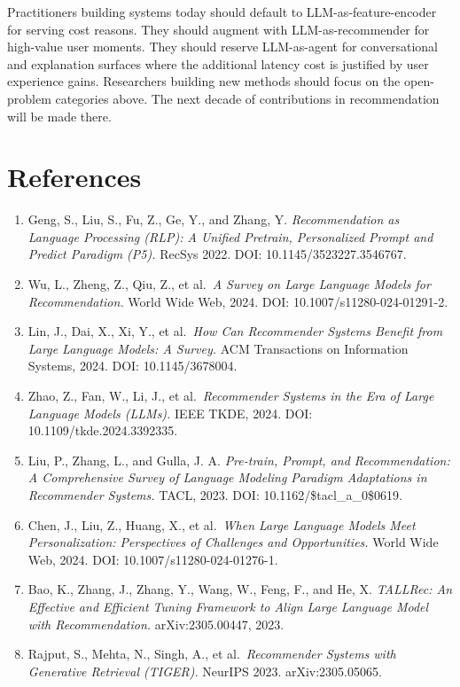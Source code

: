 Practitioners building systems today should default to LLM-as-feature-encoder for serving cost reasons. They should augment with LLM-as-recommender for high-value user moments. They should reserve LLM-as-agent for conversational and explanation surfaces where the additional latency cost is justified by user experience gains. Researchers building new methods should focus on the open-problem categories above. The next decade of contributions in recommendation will be made there.

\section{References}\label{references}

\begin{enumerate}
\def\labelenumi{\arabic{enumi}.}
\item
  Geng, S., Liu, S., Fu, Z., Ge, Y., and Zhang, Y. \emph{Recommendation as Language Processing (RLP): A Unified Pretrain, Personalized Prompt and Predict Paradigm (P5).} RecSys 2022. DOI: 10.1145/3523227.3546767.
\item
  Wu, L., Zheng, Z., Qiu, Z., et al.~\emph{A Survey on Large Language Models for Recommendation.} World Wide Web, 2024. DOI: 10.1007/s11280-024-01291-2.
\item
  Lin, J., Dai, X., Xi, Y., et al.~\emph{How Can Recommender Systems Benefit from Large Language Models: A Survey.} ACM Transactions on Information Systems, 2024. DOI: 10.1145/3678004.
\item
  Zhao, Z., Fan, W., Li, J., et al.~\emph{Recommender Systems in the Era of Large Language Models (LLMs).} IEEE TKDE, 2024. DOI: 10.1109/tkde.2024.3392335.
\item
  Liu, P., Zhang, L., and Gulla, J. A. \emph{Pre-train, Prompt, and Recommendation: A Comprehensive Survey of Language Modeling Paradigm Adaptations in Recommender Systems.} TACL, 2023. DOI: 10.1162/\$tacl\_a\_0\$0619.
\item
  Chen, J., Liu, Z., Huang, X., et al.~\emph{When Large Language Models Meet Personalization: Perspectives of Challenges and Opportunities.} World Wide Web, 2024. DOI: 10.1007/s11280-024-01276-1.
\item
  Bao, K., Zhang, J., Zhang, Y., Wang, W., Feng, F., and He, X. \emph{TALLRec: An Effective and Efficient Tuning Framework to Align Large Language Model with Recommendation.} arXiv:2305.00447, 2023.
\item
  Rajput, S., Mehta, N., Singh, A., et al.~\emph{Recommender Systems with Generative Retrieval (TIGER).} NeurIPS 2023. arXiv:2305.05065.

\end{enumerate}

